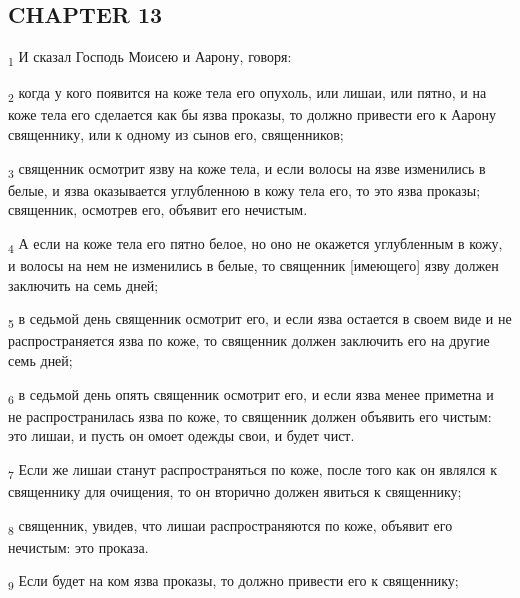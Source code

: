 \subsection{CHAPTER 13}
\begin{tcolorbox}
\textsubscript{1} И сказал Господь Моисею и Аарону, говоря:
\end{tcolorbox}
\begin{tcolorbox}
\textsubscript{2} когда у кого появится на коже тела его опухоль, или лишаи, или пятно, и на коже тела его сделается как бы язва проказы, то должно привести его к Аарону священнику, или к одному из сынов его, священников;
\end{tcolorbox}
\begin{tcolorbox}
\textsubscript{3} священник осмотрит язву на коже тела, и если волосы на язве изменились в белые, и язва оказывается углубленною в кожу тела его, то это язва проказы; священник, осмотрев его, объявит его нечистым.
\end{tcolorbox}
\begin{tcolorbox}
\textsubscript{4} А если на коже тела его пятно белое, но оно не окажется углубленным в кожу, и волосы на нем не изменились в белые, то священник [имеющего] язву должен заключить на семь дней;
\end{tcolorbox}
\begin{tcolorbox}
\textsubscript{5} в седьмой день священник осмотрит его, и если язва остается в своем виде и не распространяется язва по коже, то священник должен заключить его на другие семь дней;
\end{tcolorbox}
\begin{tcolorbox}
\textsubscript{6} в седьмой день опять священник осмотрит его, и если язва менее приметна и не распространилась язва по коже, то священник должен объявить его чистым: это лишаи, и пусть он омоет одежды свои, и будет чист.
\end{tcolorbox}
\begin{tcolorbox}
\textsubscript{7} Если же лишаи станут распространяться по коже, после того как он являлся к священнику для очищения, то он вторично должен явиться к священнику;
\end{tcolorbox}
\begin{tcolorbox}
\textsubscript{8} священник, увидев, что лишаи распространяются по коже, объявит его нечистым: это проказа.
\end{tcolorbox}
\begin{tcolorbox}
\textsubscript{9} Если будет на ком язва проказы, то должно привести его к священнику;
\end{tcolorbox}
